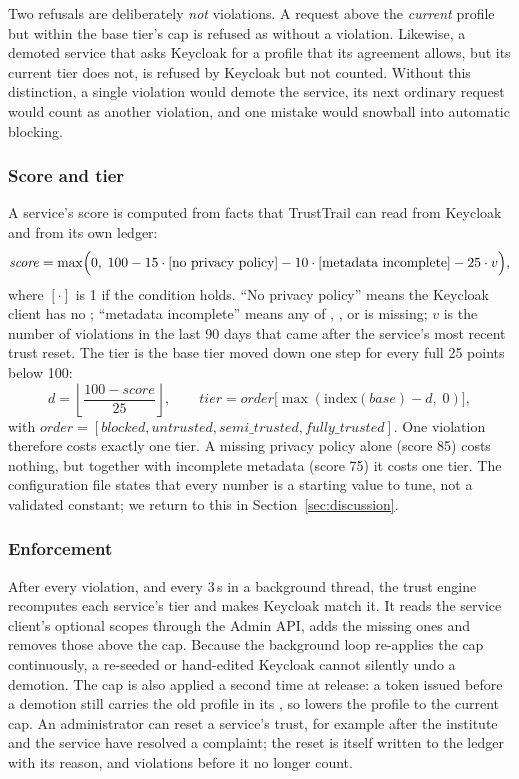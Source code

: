 Two refusals are deliberately \emph{not} violations. A request above the \emph{current} profile but within the base tier's cap is refused as  without a violation. Likewise, a demoted service that asks Keycloak for a profile that its agreement allows, but its current tier does not, is refused by Keycloak but not counted. Without this distinction, a single violation would demote the service, its next ordinary request would count as another violation, and one mistake would snowball into automatic blocking.

\subsubsection{Score and tier}
A service's score is computed from facts that TrustTrail can read from Keycloak and from its own ledger:
\begin{equation}
\mathit{score} = \max\Bigl(0,\; 100 - 15\cdot[\text{no privacy policy}] - 10\cdot[\text{metadata incomplete}] - 25\cdot v\Bigr),
\end{equation}
where $[\cdot]$ is 1 if the condition holds. ``No privacy policy'' means the Keycloak client has no ; ``metadata incomplete'' means any of , ,  or  is missing; $v$ is the number of violations in the last 90 days that came after the service's most recent trust reset. The tier is the base tier moved down one step for every full 25 points below 100:
\begin{equation}
d = \left\lfloor \frac{100 - \mathit{score}}{25} \right\rfloor, \qquad \mathit{tier} = \mathit{order}\bigl[\max(\mathrm{index}(\mathit{base}) - d,\; 0)\bigr],
\end{equation}
with $\mathit{order} = [\textit{blocked}, \textit{untrusted}, \textit{semi\_trusted}, \textit{fully\_trusted}]$. One violation therefore costs exactly one tier. A missing privacy policy alone (score 85) costs nothing, but together with incomplete metadata (score 75) it costs one tier. The configuration file states that every number is a starting value to tune, not a validated constant; we return to this in Section~\ref{sec:discussion}.

\subsubsection{Enforcement}
After every violation, and every 3\,s in a background thread, the trust engine recomputes each service's tier and makes Keycloak match it. It reads the service client's optional  scopes through the Admin API, adds the missing ones and removes those above the cap. Because the background loop re-applies the cap continuously, a re-seeded or hand-edited Keycloak cannot silently undo a demotion. The cap is also applied a second time at release: a token issued before a demotion still carries the old profile in its , so  lowers the profile to the current cap. An administrator can reset a service's trust, for example after the institute and the service have resolved a complaint; the reset is itself written to the ledger with its reason, and violations before it no longer count.

